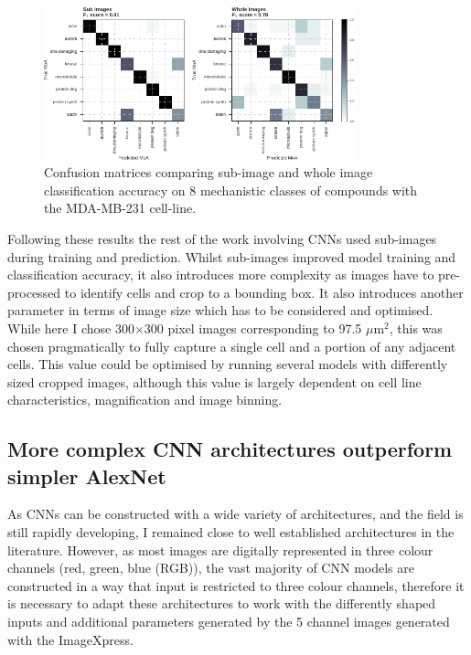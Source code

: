 \documentclass[a4paper,11pt,twoside,openright]{scrbook}
\begin{document}
\begin{figure}
    \includegraphics[width=0.8\textwidth]{ch2choppedWholeCM}
    \captionsetup{width=0.8\textwidth}
    \caption[Sub image and whole image confusion matrices]{
Confusion matrices comparing sub-image and whole image classification accuracy on 8 mechanistic classes of compounds with the MDA-MB-231 cell-line.
}
    \label{figure:nn_chopped_vs_whole_cm}
\end{figure}

Following these results the rest of the work involving CNNs used sub-images during training and prediction.
Whilst sub-images improved model training and classification accuracy, it also introduces more complexity as images have to pre-processed to identify cells and crop to a bounding box.
It also introduces another parameter in terms of image size which has to be considered and optimised.
While here I chose 300$\times$300 pixel images corresponding to 97.5 $\mu$m$^2$, this was chosen pragmatically to fully capture a single cell and a portion of any adjacent cells.
This value could be optimised by running several models with differently sized cropped images, although this value is largely dependent on cell line characteristics, magnification and image binning.


\subsection{More complex CNN architectures outperform simpler AlexNet}
As CNNs can be constructed with a wide variety of architectures, and the field is still rapidly developing, I remained close to well established architectures in the literature.
However, as most images are digitally represented in three colour channels (red, green, blue (RGB)), the vast majority of CNN models are constructed in a way that input is restricted to three colour channels, therefore it is necessary to adapt these architectures to work with the differently shaped inputs and additional parameters generated by the 5 channel images generated with the ImageXpress.
\end{document}
